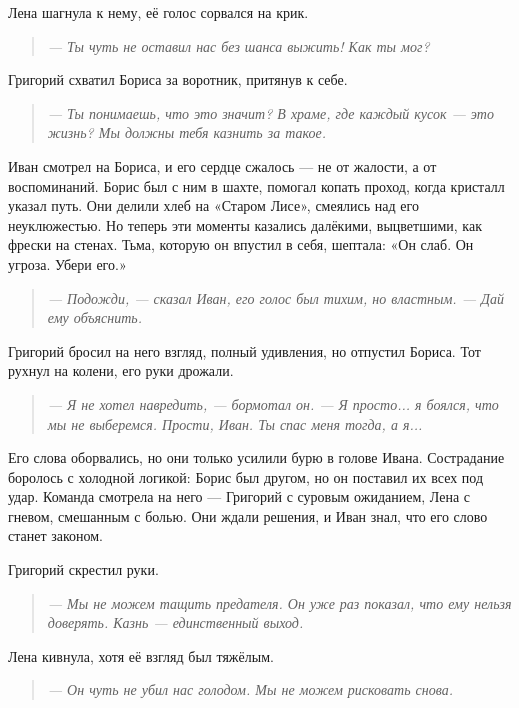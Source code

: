 \documentclass[12pt,a4paper]{book}
\newenvironment{dialogue}{\begin{quote}\itshape}{\end{quote}}
\begin{document}
Лена шагнула к нему, её голос сорвался на крик.

\begin{dialogue}
--- Ты чуть не оставил нас без шанса выжить! Как ты мог?
\end{dialogue}

Григорий схватил Бориса за воротник, притянув к себе.

\begin{dialogue}
--- Ты понимаешь, что это значит? В храме, где каждый кусок --- это жизнь? Мы должны тебя казнить за такое.
\end{dialogue}

Иван смотрел на Бориса, и его сердце сжалось --- не от жалости, а от воспоминаний. Борис был с ним в шахте, помогал копать проход, когда кристалл указал путь. Они делили хлеб на «Старом Лисе», смеялись над его неуклюжестью. Но теперь эти моменты казались далёкими, выцветшими, как фрески на стенах. Тьма, которую он впустил в себя, шептала: «Он слаб. Он угроза. Убери его.»

\begin{dialogue}
--- Подожди, --- сказал Иван, его голос был тихим, но властным. --- Дай ему объяснить.
\end{dialogue}

Григорий бросил на него взгляд, полный удивления, но отпустил Бориса. Тот рухнул на колени, его руки дрожали.

\begin{dialogue}
--- Я не хотел навредить, --- бормотал он. --- Я просто... я боялся, что мы не выберемся. Прости, Иван. Ты спас меня тогда, а я...
\end{dialogue}

Его слова оборвались, но они только усилили бурю в голове Ивана. Сострадание боролось с холодной логикой: Борис был другом, но он поставил их всех под удар. Команда смотрела на него --- Григорий с суровым ожиданием, Лена с гневом, смешанным с болью. Они ждали решения, и Иван знал, что его слово станет законом.

Григорий скрестил руки.

\begin{dialogue}
--- Мы не можем тащить предателя. Он уже раз показал, что ему нельзя доверять. Казнь --- единственный выход.
\end{dialogue}

Лена кивнула, хотя её взгляд был тяжёлым.

\begin{dialogue}
--- Он чуть не убил нас голодом. Мы не можем рисковать снова.
\end{dialogue}
\end{document}
